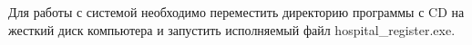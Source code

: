 Для работы с системой необходимо переместить директорию программы с CD на жесткий диск компьютера и запустить исполняемый файл hospital\_register.exe. 
